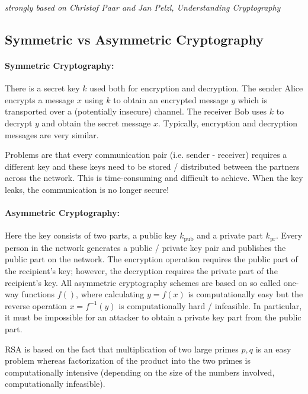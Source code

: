 
\emph{strongly based on Christof Paar and Jan Pelzl, Understanding Cryptography}

\subsection{Symmetric vs Asymmetric Cryptography}

\paragraph{Symmetric Cryptography:} There is a secret key $k$ used both for encryption and decryption. The sender Alice encrypts a message $x$ using $k$ to obtain an encrypted message $y$ which is transported over a (potentially insecure) channel. The receiver Bob uses $k$ to decrypt $y$ and obtain the secret message $x$. Typically, encryption and decryption messages are very similar.

Problems are that every communication pair (i.e. sender - receiver) requires a different key and these keys need to be stored / distributed between the partners across the network. This is time-consuming and difficult to achieve. When the key leaks, the communication is no longer secure!

\paragraph{Asymmetric Cryptography:} Here the key consists of two parts, a public key $k_{\text{pub}}$ and a private part $k_{\text{pr}}$. Every person in the network generates a public / private key pair and publishes the public part on the network. The encryption operation requires the public part of the recipient's key; however, the decryption requires the private part of the recipient's key. All asymmetric cryptography schemes are based on so called one-way functions $f()$, where calculating $y = f(x)$ is computationally easy but the reverse operation $x = f^{-1}(y)$ is computationally hard / infeasible. In particular, it must be impossible for an attacker to obtain a private key part from the public part.

RSA is based on the fact that multiplication of two large primes $p, q$ is an easy problem whereas factorization of the product into the two primes is computationally intensive (depending on the size of the numbers involved, computationally infeasible).

